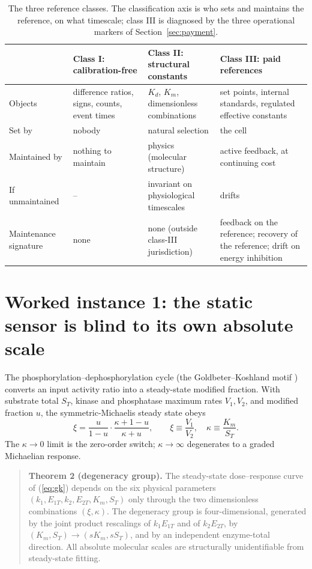 \documentclass[11pt,a4paper]{article}
\begin{document}
\begin{table}[t]
\centering
\caption{The three reference classes. The classification axis is who sets and maintains the reference, on what timescale; class III is diagnosed by the three operational markers of Section~\ref{sec:payment}.}
\label{tab:classes}
\small
\begin{tabular}{@{}p{2.6cm}p{3.6cm}p{3.4cm}p{4.6cm}@{}}
\toprule
 & \textbf{Class I: calibration-free} & \textbf{Class II: structural constants} & \textbf{Class III: paid references} \\
\midrule
Objects & difference ratios, signs, counts, event times & $K_d$, $K_m$, dimensionless combinations & set points, internal standards, regulated effective constants \\
Set by & nobody & natural selection & the cell \\
Maintained by & nothing to maintain & physics (molecular structure) & active feedback, at continuing cost \\
If unmaintained & -- & invariant on physiological timescales & drifts \\
Maintenance signature & none & none (outside class-III jurisdiction) & feedback on the reference; recovery of the reference; drift on energy inhibition \\
\bottomrule
\end{tabular}
\end{table}

\section{Worked instance 1: the static sensor is blind to its own absolute scale}
\label{sec:pdpc}

The phosphorylation--dephosphorylation cycle (the Goldbeter--Koshland motif \cite{Goldbeter1981}) converts an input activity ratio into a steady-state modified fraction. With substrate total $S_T$, kinase and phosphatase maximum rates $V_1,V_2$, and modified fraction $u$, the symmetric-Michaelis steady state obeys
\begin{equation}
\xi=\frac{u}{1-u}\cdot\frac{\kappa+1-u}{\kappa+u},\qquad \xi\equiv\frac{V_1}{V_2},\quad \kappa\equiv\frac{K_m}{S_T}.
\label{eq:gk}
\end{equation}
The $\kappa\to0$ limit is the zero-order switch; $\kappa\to\infty$ degenerates to a graded Michaelian response.

\begin{quote}
\textbf{Theorem 2 (degeneracy group).} The steady-state dose--response curve of (\ref{eq:gk}) depends on the six physical parameters $(k_1,E_{1T},k_2,E_{2T},K_m,S_T)$ only through the two dimensionless combinations $(\xi,\kappa)$. The degeneracy group is four-dimensional, generated by the joint product rescalings of $k_1E_{1T}$ and of $k_2E_{2T}$, by $(K_m,S_T)\to(sK_m,sS_T)$, and by an independent enzyme-total direction. All absolute molecular scales are structurally unidentifiable from steady-state fitting.
\end{quote}
\end{document}
